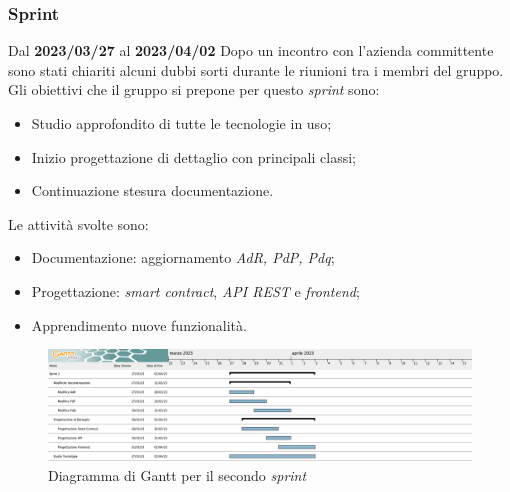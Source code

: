 \subsubsection{ Sprint}
Dal \textbf{2023/03/27} al \textbf{2023/04/02}
\newline
Dopo un incontro con l'azienda committente sono stati chiariti alcuni dubbi sorti durante le riunioni tra i membri del gruppo.
\newline
Gli obiettivi che il gruppo si prepone per questo \textit{sprint} sono:
\begin{itemize}
    \item Studio approfondito di tutte le tecnologie in uso;
    \item Inizio progettazione di dettaglio con principali classi;
    \item Continuazione stesura documentazione.
\end{itemize}
Le attività svolte sono:
\begin{itemize}
    \item Documentazione: aggiornamento \textit{AdR, PdP, Pdq};
    \item Progettazione: \textit{smart contract}, \textit{API REST} e \textit{frontend};
    \item Apprendimento nuove funzionalità.

\end{itemize}
\begin{figure}[H]
    \centering
    \includegraphics[width=\textwidth]{src/img/Sprint 2.png}
    \caption{Diagramma di Gantt per il secondo \textit{sprint}}
\end{figure}

